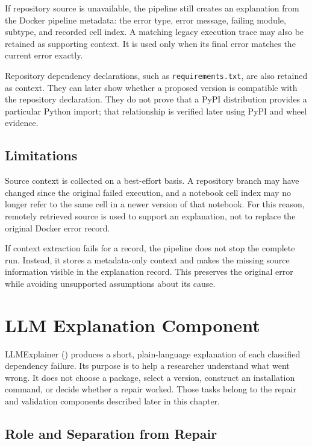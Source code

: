 If repository source is unavailable, the pipeline still creates an
explanation from the Docker pipeline metadata: the error type, error message,
failing module, subtype, and recorded cell index. A matching legacy execution
trace may also be retained as supporting context. It is used only when its
final error matches the current error exactly.

Repository dependency declarations, such as \texttt{requirements.txt}, are
also retained as context. They can later show whether a proposed version is
compatible with the repository declaration. They do not prove that a PyPI
distribution provides a particular Python import; that relationship is
verified later using PyPI and wheel evidence.

\subsection{Limitations}

Source context is collected on a best-effort basis. A repository branch may
have changed since the original failed execution, and a notebook cell index
may no longer refer to the same cell in a newer version of that notebook.
For this reason, remotely retrieved source is used to support an explanation,
not to replace the original Docker error record.

If context extraction fails for a record, the pipeline does not stop the
complete run. Instead, it stores a metadata-only context and makes the
missing source information visible in the explanation record. This preserves
the original error while avoiding unsupported assumptions about its cause.

\section{LLM Explanation Component}
\label{sec:m-explanation}

LLMExplainer () produces a short, plain-language
explanation of each classified dependency failure. Its purpose is to help a
researcher understand what went wrong. It does not choose a package, select
a version, construct an installation command, or decide whether a repair
worked. Those tasks belong to the repair and validation components described
later in this chapter.

\subsection{Role and Separation from Repair}
\label{sec:m-explanation-role}

